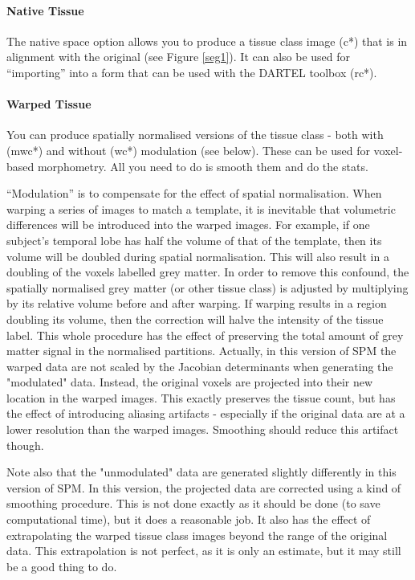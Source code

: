 \paragraph{Native Tissue}
The native space option allows you to produce a tissue class image (c*) that is in alignment with the original (see Figure \ref{seg1}). It can also be used for ``importing'' into a form that can be used with the DARTEL toolbox (rc*).


\paragraph{Warped Tissue}
You can produce spatially normalised versions of the tissue class - both with (mwc*) and without (wc*) modulation (see below). These can be used for voxel-based morphometry. All you need to do is smooth them and do the stats.



``Modulation'' is to compensate for the effect of spatial normalisation.  When warping a series of images to match a template, it is inevitable that volumetric differences will be introduced into the warped images.  For example, if one subject's temporal lobe has half the volume of that of the template, then its volume will be doubled during spatial normalisation. This will also result in a doubling of the voxels labelled grey matter.  In order to remove this confound, the spatially normalised grey matter (or other tissue class) is adjusted by multiplying by its relative volume before and after warping.  If warping results in a region doubling its volume, then the correction will halve the intensity of the tissue label. This whole procedure has the effect of preserving the total amount of grey matter signal in the normalised partitions.  Actually, in this version of SPM the warped data are not scaled by the Jacobian determinants when generating the "modulated" data.  Instead, the original voxels are projected into their new location in the warped images.  This exactly preserves the tissue count, but has the effect of introducing aliasing artifacts - especially if the original data are at a lower resolution than the warped images.  Smoothing should reduce this artifact though.

Note also that the "unmodulated" data are generated slightly differently in this version of SPM. In this version, the projected data are corrected using a kind of smoothing procedure. This is not done exactly as it should be done (to save computational time), but it does a reasonable job. It also has the effect of extrapolating the warped tissue class images beyond the range of the original data.  This extrapolation is not perfect, as it is only an estimate, but it may still be a good thing to do.


